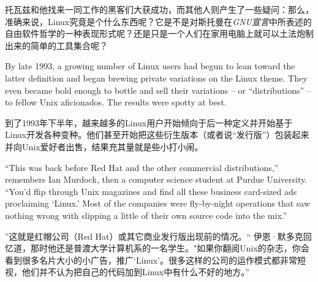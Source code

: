 \ifdefined\chs
托瓦兹和他找来一同工作的黑客们大获成功，而其他人则产生了一些疑问：那么，准确来说，Linux究竟是个什么东西呢？它是不是对斯托曼在\textit{GNU宣言}中所表述的自由软件哲学的一种表现形式呢？还是只是一个人们在家用电脑上就可以土法炮制出来的简单的工具集合呢？
\fi

\ifdefined\eng
By late 1993, a growing number of Linux users had begun to lean toward the latter definition and began brewing private variations on the Linux theme. They even became bold enough to bottle and sell their variations -- or ``distributions'' -- to fellow Unix aficionados. The results were spotty at best.
\fi

\ifdefined\chs
到了1993年下半年，越来越多的Linux用户开始倾向于后一种定义并开始基于Linux开发各种变种。他们甚至开始把这些衍生版本（或者说``发行版''）包装起来并向Unix爱好者出售，结果充其量就是些小打小闹。
\fi

\ifdefined\eng
``This was back before Red Hat and the other commercial distributions,'' remembers Ian Murdock, then a computer science student at Purdue University. ``You'd flip through Unix magazines and find all these business card-sized ads proclaiming `Linux.' Most of the companies were fly-by-night operations that saw nothing wrong with slipping a little of their own source code into the mix.''
\fi

\ifdefined\chs
''这就是红帽公司（Red Hat）或其它商业发行版出现前的情况。`` 伊恩·默多克回忆道，那时他还是普渡大学计算机系的一名学生。"如果你翻阅Unix的杂志，你会看到很多名片大小的小广告，推广`Linux'。很多这样的公司的运作模式都非常短视，他们并不认为把自己的代码加到Linux中有什么不好的地方。''
\fi

